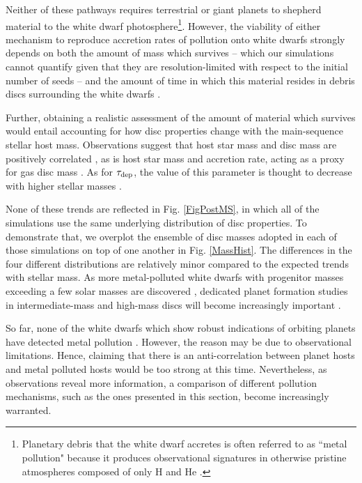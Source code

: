 \documentclass[useAMS,usenatbib]{mn2e}
\newcommand{\rev}{ }
\begin{document}
Neither of these pathways requires terrestrial or giant planets to shepherd material to the white dwarf photosphere\footnote{Planetary debris that the white dwarf accretes is often {\rev referred} to as ``metal pollution" because it produces observational signatures in otherwise pristine atmospheres composed of only H and He \citep{bonsor2024,xuetal2024}.}. However, the viability of either mechanism to reproduce accretion rates of pollution onto white dwarfs strongly depends on both the amount of mass which survives -- which our simulations cannot quantify given that they are resolution-limited with respect to the initial number of seeds -- and the amount of time in which this material resides in debris discs surrounding the white dwarfs \citep{giretal2012,verhen2020}. 

{\rev
Further, obtaining a realistic assessment of the amount of material which survives would entail accounting for how disc properties change with the main-sequence stellar host mass. Observations suggest that host star mass and disc mass are positively correlated \citep{pasetal2016,ansetal2017,tobetal2020}, as is host star mass and accretion rate, acting as a proxy for gas disc mass \citep{manetal2023}. As for $\tau_{\rm dep}$, the value of this parameter is thought to decrease with higher stellar masses \citep{ribetal2015,ricetal2018}. 

None of these trends are reflected in Fig. \ref{FigPostMS}, in which all of the simulations use the same underlying distribution of disc properties. To demonstrate that, we overplot the ensemble of disc masses adopted in each of those simulations on top of one another in Fig. \ref{MassHist}. The differences in the four different distributions are relatively minor compared to the expected trends with stellar mass. As more metal-polluted white dwarfs with progenitor masses exceeding a few solar masses are discovered \citep{ouldetal2024}, dedicated planet formation studies in intermediate-mass and high-mass discs will become increasingly important \citep{veretal2020,kunetal2021,johetal2024}.
}

So far, none of the white dwarfs which show robust indications of orbiting planets have detected metal pollution {\rev 
\citep{thoetal1993,sigetal2003,luhetal2011,ganetal2019,vanetal2020,blaetal2021,limetal2024,muletal2024,zhaetal2024}.
} However, the reason may be due to observational limitations. Hence, claiming that there is an anti-correlation between planet hosts and metal polluted hosts would be too strong at this time. Nevertheless, as observations reveal more information, a comparison of  different pollution mechanisms, such as the ones presented in this section, become increasingly warranted.   
\end{document}
